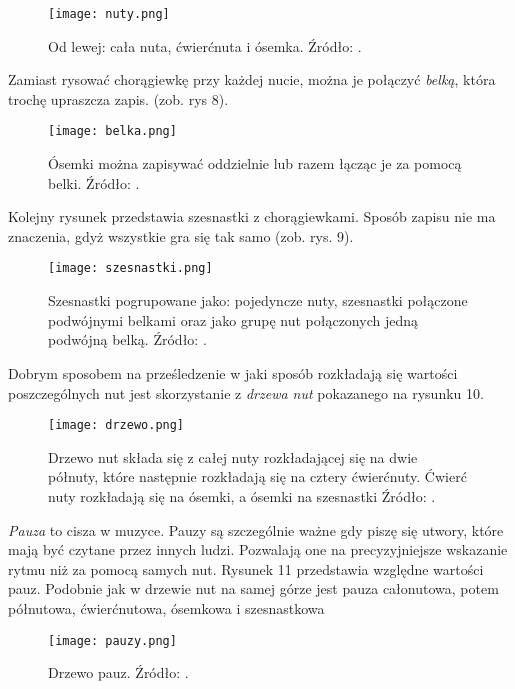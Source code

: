 \begin{figure}[H]
\texttt{[image: nuty.png]}
\centering
\caption{Od lewej: cała nuta, ćwierćnuta i ósemka. Źródło: \citep[s. 33]{Pilhofer2018}.}
\centering
\end{figure}

Zamiast rysować chorągiewkę przy każdej nucie, można je połączyć \textit{belką}, która trochę upraszcza zapis. (zob. rys 8).

\begin{figure}[H]
\texttt{[image: belka.png]}
\centering
\caption{Ósemki można zapisywać oddzielnie lub razem łącząc je za pomocą belki. Źródło: \citep[s. 33]{Pilhofer2018}.}
\centering
\end{figure}
Kolejny rysunek przedstawia szesnastki z chorągiewkami. Sposób zapisu nie ma znaczenia, gdyż wszystkie gra się tak samo (zob. rys. 9).
\begin{figure}[H]
\texttt{[image: szesnastki.png]}
\centering
\caption{Szesnastki pogrupowane jako: pojedyncze nuty, szesnastki połączone podwójnymi belkami oraz jako grupę nut połączonych jedną podwójną belką. Źródło: \citep[s. 33]{Pilhofer2018}.}
\centering
\end{figure}

Dobrym sposobem na prześledzenie w jaki sposób rozkładają się wartości poszczególnych nut jest skorzystanie z \textit{drzewa nut} pokazanego na rysunku 10. 

\begin{figure}[H]
\texttt{[image: drzewo.png]}
\centering
\caption{Drzewo nut składa się z całej nuty rozkładającej się na dwie półnuty, które następnie rozkładają się na cztery ćwierćnuty. Ćwierć nuty rozkładają się na ósemki, a ósemki na szesnastki Źródło: \citep[s. 34]{Pilhofer2018}.}
\centering
\end{figure}

\textit{Pauza} to cisza w muzyce. Pauzy są szczególnie ważne gdy piszę się utwory, które mają być czytane przez innych ludzi. Pozwalają one na precyzyjniejsze wskazanie rytmu niż za pomocą samych nut. Rysunek 11 przedstawia względne wartości pauz. Podobnie jak w drzewie nut na samej górze jest pauza całonutowa, potem półnutowa, ćwierćnutowa, ósemkowa i szesnastkowa \citep[s. 40-41]{Pilhofer2018}

\begin{figure}[H]
\texttt{[image: pauzy.png]}
\centering
\caption{Drzewo pauz. Źródło: \citep[s. 42]{Pilhofer2018}.}
\centering
\end{figure}

